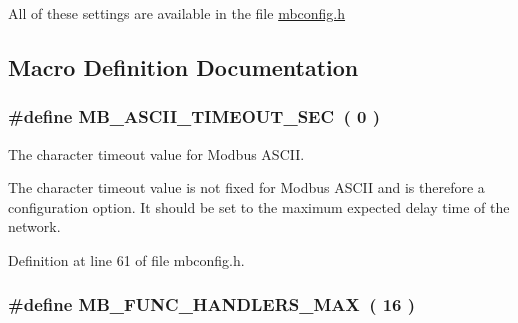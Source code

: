 All of these settings are available in the file {\ttfamily \hyperlink{mbconfig_8h_source}{mbconfig.\+h}} 

\subsection{Macro Definition Documentation}
\subsubsection[{\texorpdfstring{M\+B\+\_\+\+A\+S\+C\+I\+I\+\_\+\+T\+I\+M\+E\+O\+U\+T\+\_\+\+S\+EC}{MB_ASCII_TIMEOUT_SEC}}]{\setlength{\rightskip}{0pt plus 5cm}\#define M\+B\+\_\+\+A\+S\+C\+I\+I\+\_\+\+T\+I\+M\+E\+O\+U\+T\+\_\+\+S\+EC~(  0 )}\hypertarget{group__modbus__cfg_ga90fe92ab8f17c76c6e48dbbab8986446}{}\label{group__modbus__cfg_ga90fe92ab8f17c76c6e48dbbab8986446}


The character timeout value for Modbus A\+S\+C\+II. 

The character timeout value is not fixed for Modbus A\+S\+C\+II and is therefore a configuration option. It should be set to the maximum expected delay time of the network. 

Definition at line 61 of file mbconfig.\+h.

\subsubsection[{\texorpdfstring{M\+B\+\_\+\+F\+U\+N\+C\+\_\+\+H\+A\+N\+D\+L\+E\+R\+S\+\_\+\+M\+AX}{MB_FUNC_HANDLERS_MAX}}]{\setlength{\rightskip}{0pt plus 5cm}\#define M\+B\+\_\+\+F\+U\+N\+C\+\_\+\+H\+A\+N\+D\+L\+E\+R\+S\+\_\+\+M\+AX~( 16 )}\hypertarget{group__modbus__cfg_ga1dd115d6338ef87c83aaa23809792f25}{}\label{group__modbus__cfg_ga1dd115d6338ef87c83aaa23809792f25}


